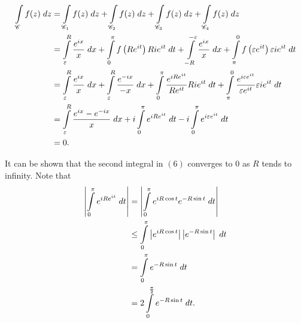 \documentclass{article}
\begin{document}
\begin{align}
\int\limits_{\mathscr{C}} f(z) \hspace{1mm} dz &= \int\limits_{\mathscr{C}_1} f(z) \hspace{1mm} dz + \int\limits_{\mathscr{C}_2} f(z) \hspace{1mm} dz +
\int\limits_{\mathscr{C}_3} f(z) \hspace{1mm} dz +
\int\limits_{\mathscr{C}_4} f(z) \hspace{1mm} dz \\
&= \int\limits_{\varepsilon}^R\frac{e^{ix}}{x} \hspace{1mm} dx + \int\limits_0^\pi f\left(Re^{it}\right)Rie^{it}\hspace{1mm} dt + 
\int\limits_{-R}^{-\varepsilon} \frac{e^{ix}}{x} \hspace{1mm} dx +
\int\limits_\pi^0 f\left(\varepsilon e^{it}\right)\varepsilon ie^{it}\hspace{1mm} dt \\
&= \int\limits_{\varepsilon}^{R}\frac{e^{ix}}{x} \hspace{1mm} dx + \int\limits_{\varepsilon}^R \frac{e^{-ix}}{-x} \hspace{1mm} dx + \int\limits_0^\pi \frac{e^{iRe^{it}}}{Re^{it}}Rie^{it} \hspace{1mm} dt + \int\limits_\pi^0 \frac{e^{i\varepsilon e^{it}}}{\varepsilon e^{it}} \varepsilon ie^{it} \hspace{1mm} dt \\
&= \int\limits_{\varepsilon}^R \frac{e^{ix} - e^{-ix}}{x} \hspace{1mm} dx + i\int\limits_0^\pi e^{iRe^{it}} \hspace{1mm} dt - i\int\limits_0^\pi e^{i\varepsilon e^{it}} \hspace{1mm} dt \\
&= 0.
\end{align}

\noindent It can be shown that the second integral in $(6)$ converges to $0$ as $R$ tends to infinity.  Note that 
\begin{align}
\left| \int\limits_0^\pi e^{iRe^{it}} \hspace{1mm} dt\right| &= \left| \int\limits_0^\pi e^{iR\cos t}e^{-R\sin t} \hspace{1mm} dt\right| \\
&\leq \int\limits_0^\pi \left| e^{iR\cos t}\right|\left|e^{-R\sin t} \right| \hspace{1mm} dt \\
&= \int\limits_0^\pi e^{-R\sin t} \hspace{1mm} dt \\
&= 2\int\limits_0^{\frac{\pi}{2}} e^{-R\sin t} \hspace{1mm} dt.
\end{align}
\end{document}
